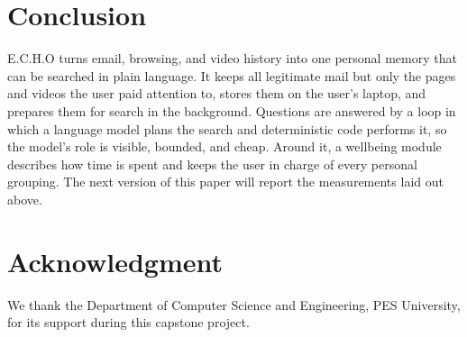 \documentclass[conference]{IEEEtran}
\begin{document}
\section{Conclusion}\label{sec:conc}
E.C.H.O turns email, browsing, and video history into one personal memory that can be searched in plain language. It keeps all legitimate mail but only the pages and videos the user paid attention to, stores them on the user's laptop, and prepares them for search in the background. Questions are answered by a loop in which a language model plans the search and deterministic code performs it, so the model's role is visible, bounded, and cheap. Around it, a wellbeing module describes how time is spent and keeps the user in charge of every personal grouping. The next version of this paper will report the measurements laid out above.

\section*{Acknowledgment}
We thank the Department of Computer Science and Engineering, PES University, for its support during this capstone project.
\end{document}
